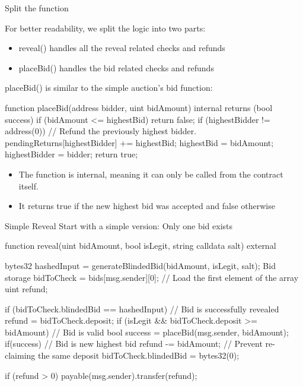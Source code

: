 \documentclass[]{beamer}
\begin{document}
\begin{frame}{Split the function}

	For better readability, we split the logic into two parts:
	\begin{itemize}
		\item reveal() handles all the reveal related checks and refunds
		\item placeBid() handles the bid related checks and refunds
	\end{itemize}
	
	placeBid() is similar to the simple auction's bid function:
	
	function placeBid(address bidder, uint bidAmount) internal returns (bool success) {
  if (bidAmount <= highestBid) {
    return false;
  }
  if (highestBidder != address(0)) {
    // Refund the previously highest bidder.
    pendingReturns[highestBidder] += highestBid;
  }
  highestBid = bidAmount;
  highestBidder = bidder;
  return true;
}

\begin{itemize}
	\item The function is internal, meaning it can only be called from the contract itself.
	\item It returns true if the new highest bid was accepted and false otherwise
\end{itemize} 

\end{frame}

\begin{frame}{Simple Reveal}
	Start with a simple version: Only one bid exists

	function reveal(uint bidAmount, bool isLegit, string calldata salt) external {
    bytes32 hashedInput = generateBlindedBid(bidAmount, isLegit, salt);
    Bid storage bidToCheck = bids[msg.sender][0]; // Load the first element of the array
    uint refund;

    if (bidToCheck.blindedBid == hashedInput) {
        // Bid is successfully revealed
        refund = bidToCheck.deposit;
        if (isLegit && bidToCheck.deposit >= bidAmount) {
            // Bid is valid
            bool success = placeBid(msg.sender, bidAmount);
            if(success) {
                // Bid is new highest bid
                refund -= bidAmount;
            }
        }
        // Prevent re-claiming the same deposit
      	bidToCheck.blindedBid = bytes32(0);
    }

    if (refund > 0) {
        payable(msg.sender).transfer(refund);
    }
}
	
\end{frame}
\end{document}
